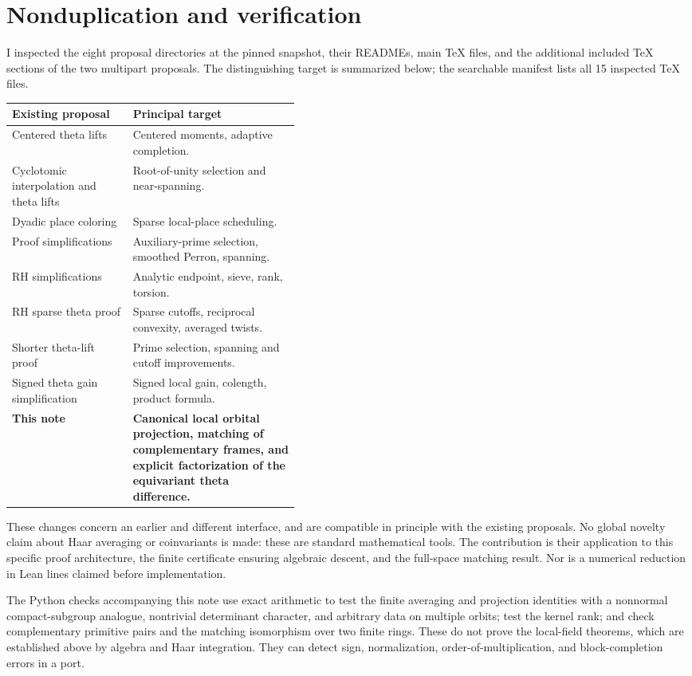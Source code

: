 \documentclass[11pt]{article}
\theoremstyle{remark}\newtheorem{remark}[theorem]{Remark}
\begin{document}
\section{Nonduplication and verification}
I inspected the eight proposal directories at the pinned snapshot, their READMEs, main TeX files, and the additional included TeX sections of the two multipart proposals. The distinguishing target is summarized below; the searchable manifest lists all 15 inspected TeX files.
\begin{center}\small
\begin{tabularx}{\linewidth}{@{}p{0.42\linewidth}X@{}}
\toprule
Existing proposal & Principal target \\
\midrule
Centered theta lifts & Centered moments, adaptive completion. \\
Cyclotomic interpolation and theta lifts & Root-of-unity selection and near-spanning. \\
Dyadic place coloring & Sparse local-place scheduling. \\
Proof simplifications & Auxiliary-prime selection, smoothed Perron, spanning. \\
RH simplifications & Analytic endpoint, sieve, rank, torsion. \\
RH sparse theta proof & Sparse cutoffs, reciprocal convexity, averaged twists. \\
Shorter theta-lift proof & Prime selection, spanning and cutoff improvements. \\
Signed theta gain simplification & Signed local gain, colength, product formula. \\
\midrule
\textbf{This note} & \textbf{Canonical local orbital projection, matching of complementary frames, and explicit factorization of the equivariant theta difference.} \\
\bottomrule
\end{tabularx}
\end{center}
These changes concern an earlier and different interface, and are compatible in principle with the existing proposals. No global novelty claim about Haar averaging or coinvariants is made: these are standard mathematical tools. The contribution is their application to this specific proof architecture, the finite certificate ensuring algebraic descent, and the full-space matching result. Nor is a numerical reduction in Lean lines claimed before implementation.

The Python checks accompanying this note use exact arithmetic to test the finite averaging and projection identities with a nonnormal compact-subgroup analogue, nontrivial determinant character, and arbitrary data on multiple orbits; test the kernel rank; and check complementary primitive pairs and the matching isomorphism over two finite rings. These do not prove the local-field theorems, which are established above by algebra and Haar integration. They can detect sign, normalization, order-of-multiplication, and block-completion errors in a port.
\end{document}
